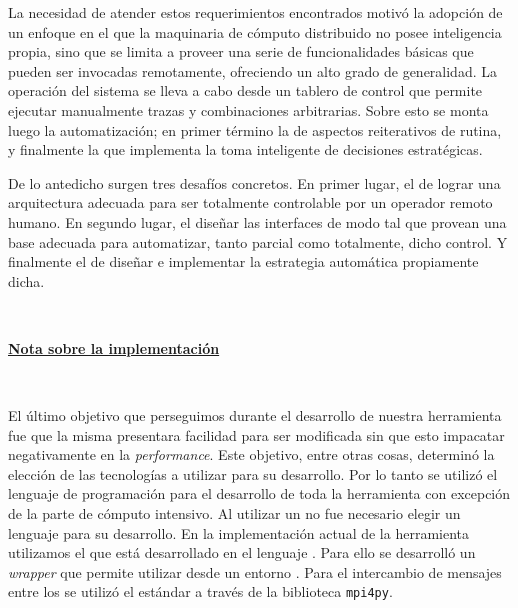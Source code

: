 La necesidad de atender estos requerimientos encontrados motivó la adopción de
un enfoque en el que la maquinaria de cómputo distribuido no posee inteligencia
propia, sino que se limita a proveer una serie de funcionalidades básicas que
pueden ser invocadas remotamente, ofreciendo un alto grado de generalidad. La
operación del sistema se lleva a cabo desde un tablero de control que permite
ejecutar manualmente trazas y combinaciones arbitrarias. Sobre esto se monta
luego la automatización; en primer término la de aspectos reiterativos de rutina,
y finalmente la que implementa la toma inteligente de decisiones estratégicas.

De lo antedicho surgen tres desafíos concretos. En primer lugar, el de lograr una
arquitectura adecuada para ser totalmente controlable por un operador remoto humano.
En segundo lugar, el diseñar las interfaces de modo tal que provean una base adecuada
para automatizar, tanto parcial como totalmente, dicho control. Y finalmente el de
diseñar e implementar la estrategia automática propiamente dicha.





\

\noindent\underline{\textbf{Nota sobre la implementación}}

\

El último objetivo que perseguimos durante el desarrollo de nuestra
herramienta fue que la misma presentara facilidad para ser modificada sin que
esto impacatar negativamente en la \emph{performance}. Este objetivo, entre
otras cosas, determinó la elección de las tecnologías a utilizar para su
desarrollo. Por lo tanto se utilizó el lenguaje de programación \Python para
el desarrollo de toda la herramienta con excepción de la parte de cómputo
intensivo. Al utilizar un \ssolver \ots no fue necesario elegir un lenguaje
para su desarrollo. En la implementación actual de la herramienta utilizamos
el \ssolver \minisatdosveinte que está desarrollado en el lenguaje \cpp. Para
ello se desarrolló un \emph{wrapper} que permite utilizar \minisat desde un
entorno \Python. Para el intercambio de mensajes entre los \ws se utilizó el
estándar \mpi a través de la biblioteca \texttt{mpi4py}\cite{mpi4py}.



